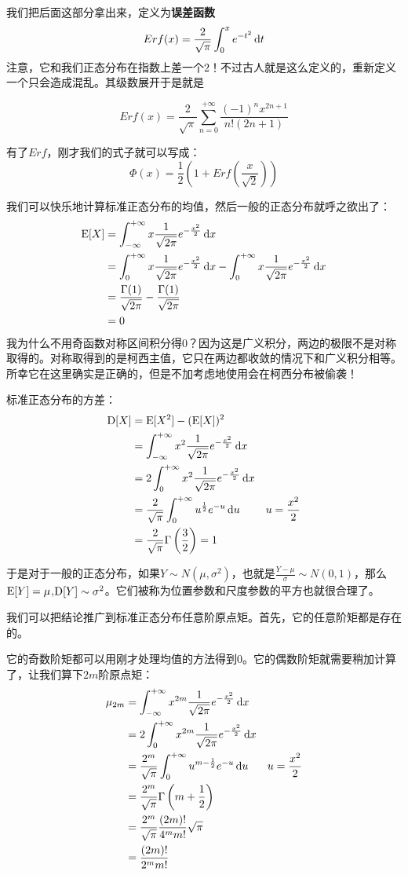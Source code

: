 我们把后面这部分拿出来，定义为\textbf{误差函数}
\[
Erf(x)=\frac{2}{\sqrt{\pi}}\int_{0}^{x}e^{-t^2}\mathop{}\!\mathrm{d} t
\]
注意，它和我们正态分布在指数上差一个$2$！不过古人就是这么定义的，重新定义一个只会造成混乱。其级数展开于是就是

\[
Erf(x) = \frac{2}{\sqrt{\pi}}\sum_{n=0}^{+\infty}\frac{(-1)^nx^{2n+1}}{n!(2n+1)}
\]

有了$Erf$，刚才我们的式子就可以写成：
\[
\Phi(x)=\frac 12 \left(1+Erf\left(\frac{x}{\sqrt{2}}\right)\right)
\]

我们可以快乐地计算标准正态分布的均值，然后一般的正态分布就呼之欲出了：
\begin{align*}
\operatorname{E}[X]&=\int_{-\infty}^{+\infty}x\frac{1}{\sqrt{2\pi}}e^{-\frac{x^2}{2}}\mathop{}\!\mathrm{d} x\\
&=\int_{0}^{+\infty}x\frac{1}{\sqrt{2\pi}}e^{-\frac{x^2}{2}}\mathop{}\!\mathrm{d} x- \int_{0}^{+\infty}x\frac{1}{\sqrt{2\pi}}e^{-\frac{x^2}{2}}\mathop{}\!\mathrm{d} x\\
&=\frac{\Gamma(1)}{\sqrt{2\pi}}-\frac{\Gamma(1)}{\sqrt{2\pi}}\\
&=0
\end{align*}
我为什么不用奇函数对称区间积分得$0$？因为这是广义积分，两边的极限不是对称取得的。对称取得到的是柯西主值，它只在两边都收敛的情况下和广义积分相等。所幸它在这里确实是正确的，但是不加考虑地使用会在柯西分布被偷袭！

标准正态分布的方差：
\begin{align*}
\operatorname{D}[X]&=\operatorname{E}[X^2]-(\operatorname{E}[X])^2\\
&= \int_{-\infty}^{+\infty}x^2\frac{1}{\sqrt{2\pi}}e^{-\frac{x^2}{2}}\mathop{}\!\mathrm{d} x\\
&= 2\int_{0}^{+\infty}x^2\frac{1}{\sqrt{2\pi}}e^{-\frac{x^2}{2}}\mathop{}\!\mathrm{d} x\\
&= \frac{2}{\sqrt{\pi}}\int_{0}^{+\infty}u^{\frac 12}e^{-u}\mathop{}\!\mathrm{d} u & u=\frac{x^2}{2}\\
&= \frac{2}{\sqrt{\pi}}\Gamma\left(\frac 32\right)=1\\
\end{align*}

于是对于一般的正态分布，如果$Y\sim N(\mu,\sigma^2)$，也就是$\frac{Y-\mu}{\sigma}\sim N(0,1)$，那么$\operatorname{E}[Y]=\mu$,$\operatorname{D}[Y]\sim \sigma^2$。它们被称为位置参数和尺度参数的平方也就很合理了。

我们可以把结论推广到标准正态分布任意阶原点矩。首先，它的任意阶矩都是存在的。

它的奇数阶矩都可以用刚才处理均值的方法得到$0$。它的偶数阶矩就需要稍加计算了，让我们算下$2m$阶原点矩：
\begin{align*}
\mu_{2m} &= \int_{-\infty}^{+\infty}x^{2m}\frac{1}{\sqrt{2\pi}}e^{-\frac{x^2}{2}}\mathop{}\!\mathrm{d} x\\
&= 2\int_{0}^{+\infty}x^{2m}\frac{1}{\sqrt{2\pi}}e^{-\frac{x^2}{2}}\mathop{}\!\mathrm{d} x\\
&= \frac{2^m}{\sqrt{\pi}}\int_{0}^{+\infty}u^{m-\frac 12}e^{-u}\mathop{}\!\mathrm{d} u& u=\frac{x^2}{2}\\
&= \frac{2^m}{\sqrt{\pi}}\Gamma\left( m + \frac 12 \right)\\
&= \frac{2^m}{\sqrt{\pi}}\frac{(2m)!}{4^m m!}\sqrt{\pi}\\
&= \frac{(2m)!}{2^m m!}
\end{align*}

